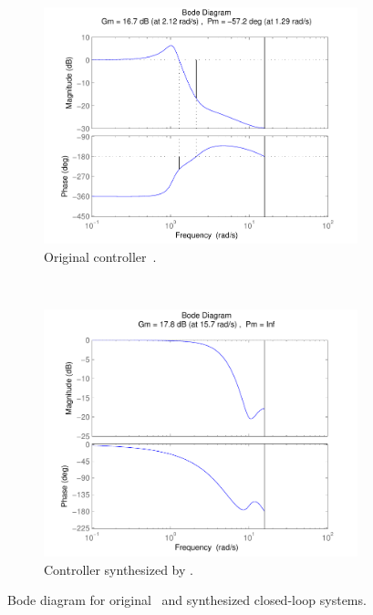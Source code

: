 \documentclass{sig-alternate-05-2015}
\newcommand{\blue}[1]{{\color{blue}#1}}
\begin{document}
%
\begin{figure}[htb]
    \centering
    \begin{subfigure}[b]{0.4\textwidth}
        \includegraphics[width=\textwidth]{figures/runningexample_bd0.pdf}
        \caption{Original controller~\cite{DBLP:conf/hybrid/WangGRJF16}.}
        \label{fig:original}
    \end{subfigure}
    ~
    \begin{subfigure}[b]{0.4\textwidth}
        \includegraphics[width=\textwidth]{figures/runningexample_bd2.pdf}
        \caption{Controller synthesized by \tool.}
        \label{fig:cegiscontroller}
    \end{subfigure}
    \caption{Bode diagram for original~\cite{DBLP:conf/hybrid/WangGRJF16} and synthesized closed-loop systems.}\label{fig:bode}
\end{figure}
\end{document}
